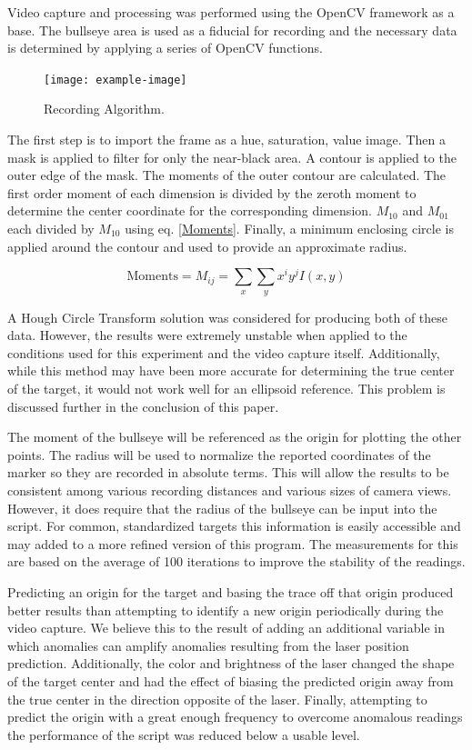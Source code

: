 \documentclass[conference]{IEEEtran}
\begin{document}
Video capture and processing was performed using the 
OpenCV \cite{itseez2015opencv, itseez2014theopencv} framework as a base.
The bullseye area is used as a fiducial for recording and 
the necessary data is determined by applying a series of OpenCV functions.

\begin{figure}[]
	\centering
	\texttt{[image: example-image]}
	\caption{Recording Algorithm.}
	\label{fig:capture_algorithm}
\end{figure}

The first step is to import the frame as a hue, saturation, value image.
Then a mask is applied to filter for only the near-black area.
A contour is applied to the outer edge of the mask.
The moments of the outer contour are calculated.
The first order moment of each dimension is divided by the zeroth moment to determine the center coordinate for the corresponding dimension.
$M_{10}$ and $M_{01}$ each divided by $M_{10}$ using eq. \eqref{Moments}.
Finally, a minimum enclosing circle is applied around the contour and used to provide an approximate radius.

\begin{equation}\label{Moments}
	\text{Moments} = M_{ij} = \sum_{x} \sum_{y} x^i y^j I(x,y)
\end{equation}

A Hough Circle Transform solution \cite{Hough1964} was considered for producing both of these data.
However, the results were extremely unstable when applied to the conditions used for this experiment and the video capture itself.
Additionally, while this method may have been more accurate for determining the true center of the target, it would not work well for an ellipsoid reference.
This problem is discussed further in the conclusion of this paper.

The moment of the bullseye will be referenced as the origin for plotting the other points. 
The radius will be used to normalize the reported coordinates of the marker so they are recorded in absolute terms.
This will allow the results to be consistent among various recording distances and various sizes of camera views.
However, it does require that the radius of the bullseye can be input into the script.
For common, standardized targets this information is easily accessible
\cite{issfRules} and may added to a more refined version of this program.
The measurements for this are based on the average of 100 iterations to improve the stability of the readings.

Predicting an origin for the target and basing the trace off that origin produced better results than attempting to identify a new origin periodically during the video capture.
We believe this to the result of adding an additional variable in which anomalies can amplify anomalies resulting from the laser position prediction. 
Additionally, the color and brightness of the laser changed the shape of the target center and had the effect of biasing the predicted origin away from the true center in the direction opposite of the laser.
Finally, attempting to predict the origin with a great enough frequency to overcome anomalous readings the performance of the script was reduced below a usable level.
\end{document}
